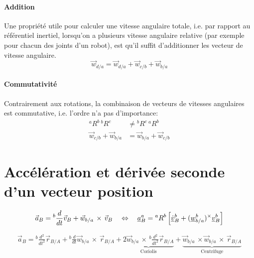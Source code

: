 \paragraph{Addition} Une propriété utile pour calculer une vitesse angulaire totale, i.e. par rapport au référentiel inertiel, lorsqu'on a plusieurs vitesse angulaire relative (par exemple pour chacun des joints d'un robot), est qu'il suffit d'additionner les vecteur de vitesse angulaire. 
\begin{equation}
\vec{w}_{d/a} = \vec{w}_{d/a}  + \vec{w}_{c/b} + \vec{w}_{b/a} 
\label{eq:angspeedadd}
\end{equation}
\paragraph{Commutativité} Contrairement aux rotations, la combinaison de vecteurs de vitesses angulaires est commutative, i.e. l'ordre n'a pas d'importance:
\begin{align}
{}^aR^b \, {}^bR^c  &\neq {}^bR^c \, {}^aR^b  \\
\vec{w}_{c/b} + \vec{w}_{b/a}  &= \vec{w}_{b/a}  + \vec{w}_{c/b}
\end{align}



\newpage
\section{Accélération et dérivée seconde d'un vecteur position}
\label{sec:acc}



\begin{align}
\vec{a}_{B} = {}^{b}\frac{d}{dt} \vec{v}_{B} +  \vec{w}_{b/a} \, \times \, \vec{v}_{B}
\quad \Leftrightarrow \quad 
\underline{a}_{B}^{a} = {}^{a}R^b \left[ \underline{\dot{v}}^b_{B} +  (\underline{w}_{b/a}^b)^{\times} \underline{v}^b_{B}  \right] 
\end{align}

\begin{align}
\vec{a}_{B} = 
{}^{b}\frac{d^2}{dt^2} \vec{r}_{B/A} 
+  
{}^{b}\frac{d}{dt} \vec{w}_{b/a} \, \times \, \vec{r}_{B/A}
+
\underbrace{
2 \vec{w}_{b/a} \, \times \, {}^{b}\frac{d^2}{dt^2} \vec{r}_{B/A}
}_{\text{Coriolis}}
+
\underbrace{
\vec{w}_{b/a} \, \times \vec{w}_{b/a} \, \times \,
\vec{r}_{B/A}
}_{\text{Centrifuge}}
\end{align}

